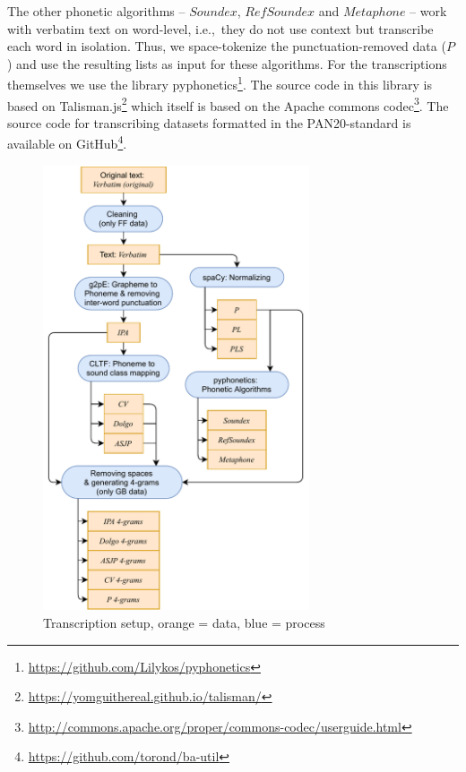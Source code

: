 The other phonetic algorithms -- $Soundex$, $RefSoundex$ and $Metaphone$ -- work with verbatim text on word-level, i.e.,\ they do not use context but transcribe each word in isolation.
Thus, we space-tokenize the punctuation-removed data ($P$) and use the resulting lists as input for these algorithms.
For the transcriptions themselves we use the library pyphonetics\footnote{\url{https://github.com/Lilykos/pyphonetics}}.
The source code in this library is based on Talisman.js\footnote{\url{https://yomguithereal.github.io/talisman/}} which itself is based on the Apache commons codec\footnote{\url{http://commons.apache.org/proper/commons-codec/userguide.html}}.
The source code for transcribing datasets formatted in the PAN20-standard is available on GitHub\footnote{\url{https://github.com/torond/ba-util}}.

\begin{figure}
  \centering
  \includegraphics[width=0.7\textwidth]{figures/transcription}
  \caption{Transcription setup, orange = data, blue = process}
  \label{fig:transcription}
\end{figure}


